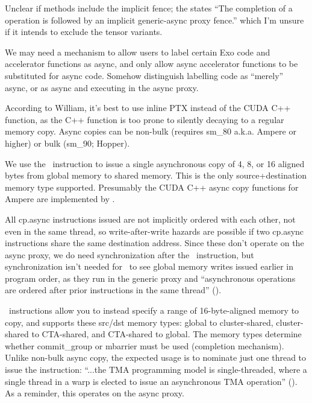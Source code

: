 Unclear if  methods include the implicit fence; the  states ``The completion of a  operation is followed by an implicit generic-async proxy fence.'' which I'm unsure if it intends to exclude the tensor variants.

\filbreak
{} We may need a mechanism to allow users to label certain Exo code and accelerator functions as async, and only allow async accelerator functions to be substituted for async code. Somehow distinguish labelling code as ``merely'' async, or as async and executing in the async proxy.

\filbreak
{}

According to William, it's best to use inline PTX instead of the CUDA C++  function, as the C++ function is too prone to silently decaying to a regular memory copy. Async copies can be non-bulk (requires sm\_80 a.k.a. Ampere or higher) or bulk (sm\_90; Hopper).

\filbreak
{} We use the \cpAsync\ instruction to issue a single asynchronous copy of 4, 8, or 16 aligned bytes from global memory to shared memory. This is the only source+destination memory type supported. Presumably the CUDA C++ async copy functions for Ampere are implemented by .

All cp.async instructions issued are not implicitly ordered with each other, not even in the same thread, so write-after-write hazards are possible if two cp.async instructions share the same destination address. Since these don't operate on the async proxy, we do need synchronization after the \cpAsync\ instruction, but synchronization isn't needed for \cpAsync\ to see global memory writes issued earlier in program order, as they run in the generic proxy and ``asynchronous operations are ordered after prior instructions in the same thread'' ().

\filbreak
{} \cpAsyncBulk\ instructions allow you to instead specify a range of 16-byte-aligned memory to copy, and supports these src/dst memory types: global to cluster-shared, cluster-shared to CTA-shared, and CTA-shared to global. The memory types determine whether commit\_group or mbarrier must be used (completion mechanism). Unlike non-bulk async copy, the expected usage is to nominate just one thread to issue the instruction: ``...the TMA programming model is single-threaded, where a single thread in a warp is elected to issue an asynchronous TMA operation'' (\hopperBlog). As a reminder, this operates on the async proxy.

